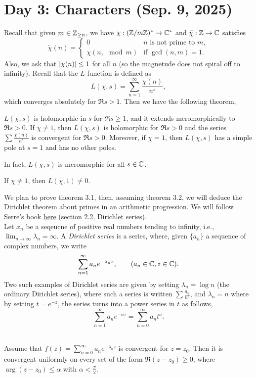 \section{Day 3: Characters (Sep. 9, 2025)}
Recall that given $m \in \mathbb Z_{\geq n}$, we have $\chi : (\mathbb Z / m\mathbb Z)^\ast \to \mathbb C^\ast$ and $\tilde{\chi} : \mathbb Z \to \mathbb C$ satisfies
\[ \tilde{\chi}(n) = \begin{cases} 0 & n \text{ is not prime to } m, \\ \chi(n, \mod m) & \text{if } \gcd(n, m) = 1. \end{cases} \]
Also, we ask that $\left\lvert \chi(n) \right\rvert \leq 1$ for all $n$ (so the magnetude does not spiral off to infinity). Recall that the $L$-function is defined as
\[ L(\chi, s) = \sum_{n=1}^\infty \frac{\chi(n)}{n^s}, \]
which converges absolutely for $\Re s > 1$. Then we have the following theorem,
\begin{theorem}
    $L(\chi, s)$ is holomorphic in $s$ for $\Re s \geq 1$, and it extends meromorphically to $\Re s > 0$. If $\chi \neq 1$, then $L(\chi, s)$ is holomorphic for $\Re s > 0$ and the series $\sum \frac{\chi(n)}{n^s}$ is convergent for $\Re s > 0$. Moreover, if $\chi = 1$, then $L(\chi, s)$ has a simple pole at $s = 1$ and has no other poles.
\end{theorem}
\noindent In fact, $L(\chi, s)$ is meromorphic for all $s \in \mathbb C$. 
\begin{theorem}
    If $\chi \neq 1$, then $L(\chi, 1) \neq 0$.
\end{theorem}
\noindent We plan to prove theorem 3.1, then, assuming theorem 3.2, we will deduce the Dirichlet theorem about primes in an arithmetic progression. We will follow Serre's book \href{https://www.math.purdue.edu/~jlipman/MA598/Serre-Course%20in%20Arithmetic.pdf}{here} (section 2.2, Dirichlet series).
\\[8pt]
Let $x_n$ be a seqeucne of positive real numbers tending to infinity, i.e., $\lim_{n \to \infty} \lambda_n = \infty$. A \textit{Dirichlet series} is a series, where, given $\{a_n\}$ a sequence of complex numbers, we write
\[ \sum_{n=1}^\infty a_n e^{-\lambda_n z}, \qquad (a_n \in \mathbb C, z \in \mathbb C). \]
Two such examples of Dirichlet series are given by setting $\lambda_n = \log n$ (the ordinary Dirichlet series), where such a series is written $\sum \frac{a_n}{n^s}$, and $\lambda_n = n$ where by setting $t = e^{-z}$, the series turns into a power series in $t$ as follows,
\[ \sum_{n=1}^\infty a_n e^{-nz} = \sum_{n=0}^\infty a_n t^a. \]
\\[-28pt]
\begin{theorem}
    Assume that $f(z) = \sum_{n=0}^\infty a_n e^{-\lambda_n z}$ is convergent for $z = z_0$. Then it is convergent uniformly on every set of the form $\Re(z - z_0) \geq 0$, where $\arg(z - z_0) \leq \alpha$ with $\alpha < \frac{\pi}{2}$.
\end{theorem}
